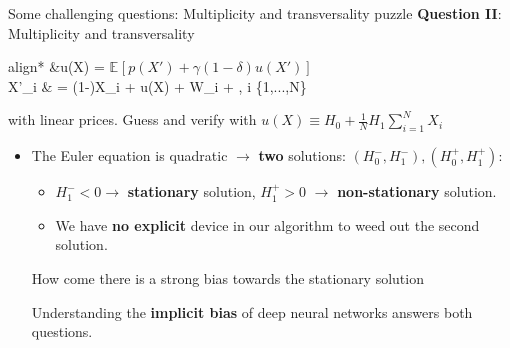\documentclass[aspectratio=169,10pt]{beamer}
\newcommand{\emphcolor}[1]{\textbf{\textcolor{emphcolorval}{#1}}}
\newcommand{\expec}[2][]{\ensuremath{\mathbb{E}_{{#1}}\left[ {#2} \right]}}
\begin{document}
\begin{frame}{Some challenging questions: Multiplicity and transversality puzzle}
\emphcolor{Question II}: Multiplicity and transversality 
	\begin{empheq}[box=\tcbhighmath]{align*}
		&\gamma u(X) = \beta \expec{p(X')+\gamma (1-\delta) u(X') }\\
		  X'_i & = (1-\delta)X_i + u(X) + \sigma W_i + \eta \omega,\quad{} i \in \{1,...,N\}
	\end{empheq}
with linear prices. Guess and verify with $u(X) \equiv H_0 + \frac{1}{N} H_1 \sum_{i=1}^N X_i$  
\begin{itemize}
		\item The Euler equation is quadratic $\rightarrow$ \emphcolor{two} solutions: $(H_0^-, H_1^-), (H_0^+, H_1^+)$:\vspace{0.1in}
	\begin{itemize}
		\item $H_1^- <0 \rightarrow$  \emphcolor{stationary} solution, $H_1^+ > 0$ $\rightarrow$ \emphcolor{non-stationary} solution. \vspace{0.1in}
		\item We have \emphcolor{no explicit} device in our algorithm to weed out the second solution. \vspace{0.1in}
	\end{itemize}
How come there is a strong bias towards the stationary solution
	\vspace{0.1in}
	
	Understanding the \emphcolor{implicit bias} of deep neural networks answers both questions. 
\end{itemize}
\end{frame}	
				
\end{document}
